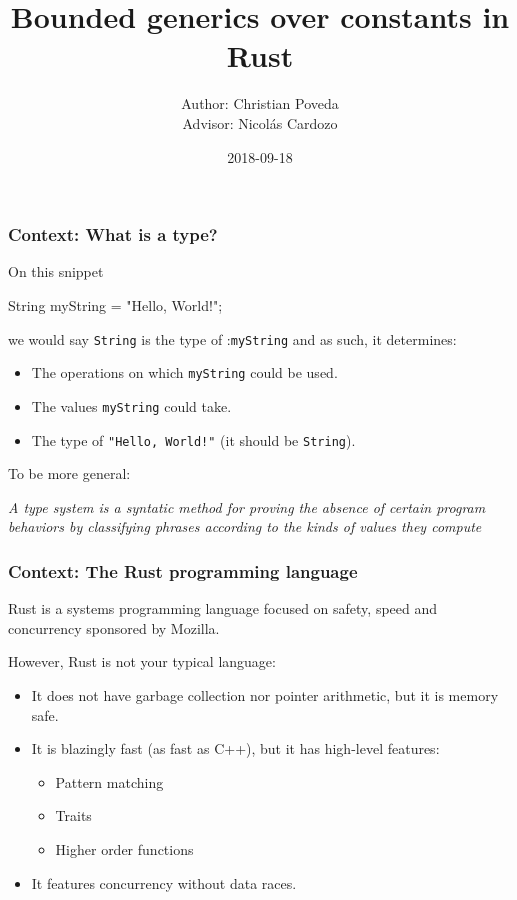 \documentclass{beamer}
\title{Bounded generics over constants in Rust}
\author{Author: Christian Poveda \\ Advisor: Nicolás Cardozo}
\institute{Systems and Computing Engineering Department \\ Universidad de los Andes}
\date{2018-09-18}
\newcommand{\code}[1] {\texttt{\footnotesize #1}}
\begin{document}
\frame{\titlepage}

\begin{frame}[fragile]
    \frametitle{Context: What is a type?}
    On this snippet
    \begin{javacode}
        String myString = "Hello, World!";
    \end{javacode}
    we would say \code{String} is the type of :\code{myString} and as such, it determines:
    \begin{itemize}
        \item The operations on which \code{myString} could be used.
        \item The values \code{myString} could take.
        \item The type of \code{"Hello, World!"} (it should be \code{String}).
    \end{itemize}
    To be more general: 
    \begin{center}
        \textit{A type system is a syntatic method for proving the absence of certain program behaviors by classifying phrases according to the kinds of values they compute}
    \end{center}
\end{frame}

\begin{frame}[fragile]
    \frametitle{Context: The Rust programming language}
    Rust is a systems programming language focused on safety, speed and concurrency sponsored by Mozilla. 
    
    However, Rust is not your typical language:
    \begin{itemize}
        \item It does not have garbage collection nor pointer arithmetic, but it is memory safe.
        \item It is blazingly fast (as fast as C++), but it has high-level features:
            \begin{itemize}
                \item Pattern matching
                \item Traits
                \item Higher order functions
            \end{itemize}
        \item It features concurrency without data races.
    \end{itemize}
\end{frame}
\end{document}
